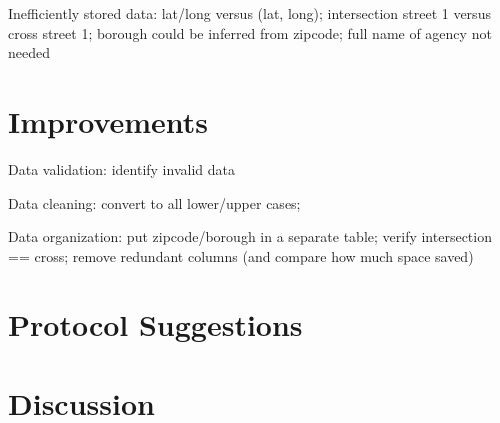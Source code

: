 \documentclass[12pt, titlepage]{article}
\numberwithin{equation}{section}
\begin{document}
Inefficiently stored data: lat/long versus (lat, long);
intersection street 1 versus cross street 1;
borough could be inferred from zipcode;
full name of agency not needed

\section{Improvements} \label{sec:improve}

Data validation: identify invalid data


Data cleaning: convert to all lower/upper cases;


Data organization: put zipcode/borough in a separate table; verify intersection
== cross; remove redundant columns (and compare how much space saved)


\section{Protocol Suggestions} \label{sec:protocol}



\section{Discussion} \label{sec:disc}




\end{document}
